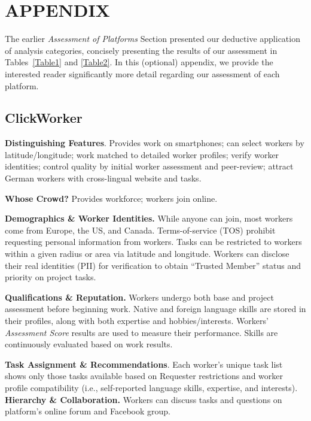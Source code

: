 \documentclass{sigchi}
\begin{document}
\balance





\section{APPENDIX}

The earlier {\em Assessment of Platforms} Section presented our deductive application of analysis categories, concisely presenting the results of our assessment in Tables~\ref{Table1} and \ref{Table2}. In this (optional) appendix, we provide the interested reader significantly more detail regarding our assessment of each platform.

\subsection{ClickWorker} 
{\bf Distinguishing Features}. Provides work on smartphones; can select workers by latitude/longitude; work matched to detailed worker profiles; verify worker identities; control quality by initial worker assessment and peer-review; attract German workers with cross-lingual website and tasks.


{\bf Whose Crowd?} Provides workforce; workers join online. 

{\bf Demographics \& Worker Identities.} While anyone can join, most workers come from Europe, the US, and Canada. Terms-of-service (TOS) prohibit requesting personal information from workers.  
Tasks can be restricted to workers within a given radius or area via latitude and longitude. 
Workers can disclose their real identities (PII) for verification to obtain ``Trusted Member'' status and priority on project tasks.

{\bf Qualifications \& Reputation.} Workers undergo both base and project assessment before beginning work. Native and foreign language skills are stored in their profiles, along with both expertise and hobbies/interests. Workers' {\em Assessment Score} results are used to measure their performance. Skills are continuously evaluated based on work results.

{\bf Task Assignment \& Recommendations}. Each worker's unique task list shows only those tasks available based on Requester restrictions and worker profile compatibility (i.e., self-reported language skills, expertise, and interests). 
{\bf Hierarchy \& Collaboration.} Workers can 
discuss tasks and questions on platform's online forum
and Facebook group.
\end{document}
